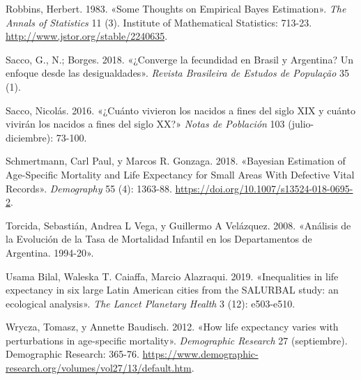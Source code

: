 \documentclass[12pt,spanish,]{article}
\begin{document}
\leavevmode\hypertarget{ref-Robbins1983}{}%
Robbins, Herbert. 1983. «Some Thoughts on Empirical Bayes Estimation».
\emph{The Annals of Statistics} 11 (3). Institute of Mathematical
Statistics: 713-23. \url{http://www.jstor.org/stable/2240635}.

\leavevmode\hypertarget{ref-SaccoBorges2018}{}%
Sacco, G., N.; Borges. 2018. «¿Converge la fecundidad en Brasil y
Argentina? Un enfoque desde las desigualdades». \emph{Revista Brasileira
de Estudos de População} 35 (1).

\leavevmode\hypertarget{ref-Sacco2016}{}%
Sacco, Nicolás. 2016. «¿Cuánto vivieron los nacidos a fines del siglo
XIX y cuánto vivirán los nacidos a fines del siglo XX?» \emph{Notas de
Población} 103 (julio-diciembre): 73-100.

\leavevmode\hypertarget{ref-Schmertmann2018}{}%
Schmertmann, Carl Paul, y Marcos R. Gonzaga. 2018. «Bayesian Estimation
of Age-Specific Mortality and Life Expectancy for Small Areas With
Defective Vital Records». \emph{Demography} 55 (4): 1363-88.
\url{https://doi.org/10.1007/s13524-018-0695-2}.

\leavevmode\hypertarget{ref-Torcida2008}{}%
Torcida, Sebastián, Andrea L Vega, y Guillermo A Velázquez. 2008.
«Análisis de la Evolución de la Tasa de Mortalidad Infantil en los
Departamentos de Argentina. 1994-20».

\leavevmode\hypertarget{ref-Bilal2019}{}%
Usama Bilal, Waleska T. Caiaffa, Marcio Alazraqui. 2019. «Inequalities
in life expectancy in six large Latin American cities from the SALURBAL
study: an ecological analysis». \emph{The Lancet Planetary Health} 3
(12): e503-e510.

\leavevmode\hypertarget{ref-Wrycza2012}{}%
Wrycza, Tomasz, y Annette Baudisch. 2012. «How life expectancy varies
with perturbations in age-specific mortality». \emph{Demographic
Research} 27 (septiembre). Demographic Research: 365-76.
\url{https://www.demographic-research.org/volumes/vol27/13/default.htm}.
\end{document}
